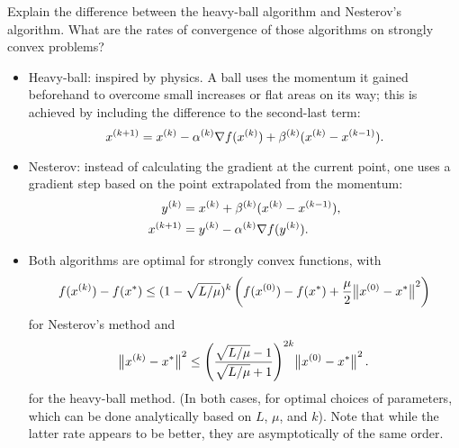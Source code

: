 \documentclass{article}
\begin{document}
\begin{question}
  Explain the difference between the heavy-ball algorithm and Nesterov’s algorithm.  What are the
  rates of convergence of those algorithms on strongly convex problems?
\end{question}
\begin{itemize}
\item Heavy-ball: inspired by physics.  A ball uses the momentum it gained beforehand to overcome
  small increases or flat areas on its way; this is achieved by including the difference to the
  second-last term:
  \begin{equation*}
    \kth[k+1]{x} = \kth{x} - \kth{\alpha} \nabla f(\kth{x}) + \kth{\beta}(\kth{x} - \kth[k-1]{x}).
  \end{equation*}
\item Nesterov: instead of calculating the gradient at the current point, one uses a gradient step
  based on the point extrapolated from the momentum:
  \begin{align*}
    \kth{y} &= \kth{x} + \kth{\beta}(\kth{x} - \kth[k-1]{x}), \\
    \kth[k+1]{x} &= \kth{y} - \kth{\alpha} \nabla f(\kth{y}).
  \end{align*}
\item Both algorithms are optimal for strongly convex functions, with
    \begin{equation*}
    f(\kth{x}) - f(x^*) \leq (1 - \sqrt{L/\mu})^k
    \left( f(\kth[0]{x}) - f(x^*) + \frac{\mu}{2} \enVert[1]{\kth[0]{x} - x^*}^2 \right)
  \end{equation*}
  for Nesterov's method and
  \begin{equation*}
    \enVert[1]{\kth{x} - x^*}^2 \leq
    \left( \frac{\sqrt{L/\mu} - 1}{\sqrt{L/\mu} + 1} \right)^{2k} \enVert[1]{\kth[0]{x} - x^*}^2.
  \end{equation*}
  for the heavy-ball method.  (In both cases, for optimal choices of parameters, which can be done
  analytically based on \(L\), \(\mu\), and \(k\)).  Note that while the latter rate appears to be
  better, they are asymptotically of the same order.
\end{itemize}
\end{document}
